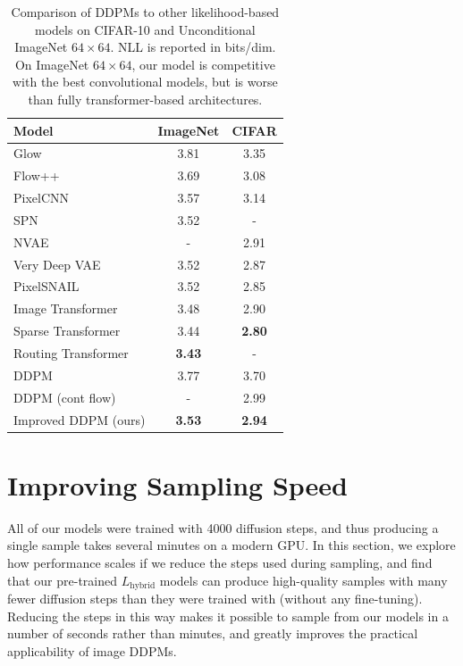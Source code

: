 \documentclass{article}
\begin{document}
\begin{table}[t]
    \caption{\label{tbl:allvlbcomparison} Comparison of DDPMs to other likelihood-based models on CIFAR-10 and Unconditional ImageNet $64 \times 64$. NLL is reported in bits/dim. On ImageNet $64 \times 64$, our model is competitive with the best convolutional models, but is worse than fully transformer-based architectures.}
    \centering
    \vskip 0.15in
	\begin{center}
	\begin{small}
    \begin{tabular}{lcc}
    	\toprule
        Model & ImageNet & CIFAR \\
        \midrule
        Glow \citep{glow} & 3.81 & 3.35 \\
        Flow++ \citep{flow++} & 3.69 & 3.08 \\
        PixelCNN \citep{pixelcnn} & 3.57 & 3.14 \\
        SPN \citep{spn} & 3.52 & - \\
        NVAE \citep{nvae} & - & 2.91 \\
        Very Deep VAE \citep{vdvae} & 3.52 & 2.87 \\
        PixelSNAIL \citep{pixelsnail} & 3.52 & 2.85 \\
        Image Transformer \citep{imagetransformer} & 3.48 & 2.90 \\
        Sparse Transformer \citep{sparsetransformer} & 3.44 & \bf 2.80 \\
        Routing Transformer \citep{routingtransformer} & \bf 3.43 & - \\
        \midrule 
        DDPM \citep{ddpm} & 3.77 & 3.70 \\
        DDPM (cont flow) \citep{sde} & - & 2.99 \\
        Improved DDPM (ours) & \bf 3.53 & \bf 2.94 \\
        \bottomrule
    \end{tabular}
    \end{small}
    \end{center}
    \vskip -0.1in
\end{table}

\section{Improving Sampling Speed}
\label{sec:numberofsteps}

All of our models were trained with 4000 diffusion steps, and thus producing a single sample takes several minutes on a modern GPU. In this section, we explore how performance scales if we reduce the steps used during sampling, and find that our pre-trained $L_{\text{hybrid}}$ models can produce high-quality samples with many fewer diffusion steps than they were trained with (without any fine-tuning). Reducing the steps in this way makes it possible to sample from our models in a number of seconds rather than minutes, and greatly improves the practical applicability of image DDPMs.
\end{document}
